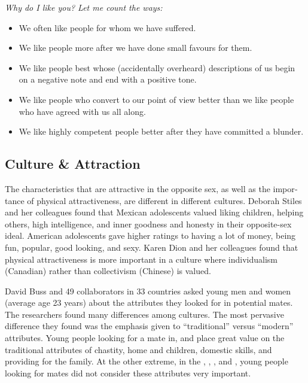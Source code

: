 \documentclass[
]{book}
\providecommand{\tightlist}{%
  \setlength{\itemsep}{0pt}\setlength{\parskip}{0pt}}
\begin{document}
\emph{Why do I like you? Let me count the ways:}

\begin{itemize}
\tightlist
\item
  We often like people for whom we have suffered.\\
\item
  We like people more after we have done small favours for them.\\
\item
  We like people best whose (accidentally over­heard) descriptions of us begin on a negative note and end with a posi­tive tone.\\
\item
  We like people who convert to our point of view better than we like people who have agreed with us all along.\\
\item
  We like highly competent people better after they have committed a blunder.
\end{itemize}

\hypertarget{culture-attraction}{%
\subsection*{Culture \& Attraction}\label{culture-attraction}}

The characteristics that are attractive in the opposite sex, as well as the impor­tance of physical attractiveness, are different in different cultures. Deborah Stiles and her colleagues found that Mexican adolescents valued liking children, helping others, high intelligence, and inner goodness and honesty in their oppo­site-sex ideal. American adolescents gave higher ratings to having a lot of money, being fun, popular, good looking, and sexy. Karen Dion and her colleagues found that physical attractiveness is more impor­tant in a culture where individualism (Canadian) rather than collectivism (Chinese) is valued.

David Buss and 49 collaborators in 33 countries asked young men and women (average age 23 years) about the attributes they looked for in potential mates. The researchers found many differences among cultures. The most pervasive difference they found was the emphasis given to ``traditional'' versus ``modern'' attributes. Young people looking for a mate in, and place great value on the traditional attributes of chastity, home and children, domestic skills, and providing for the family. At the other extreme, in the , , , and , young people looking for mates did not consider these attributes very important.
\end{document}
